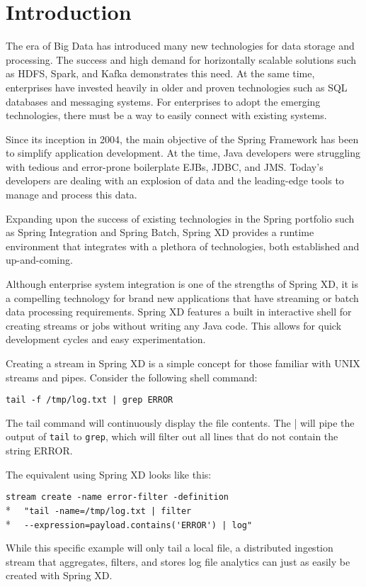 \section{Introduction}

The era of Big Data has introduced many new technologies for data storage
and processing. The success and high demand for horizontally scalable
solutions such as HDFS, Spark, and Kafka demonstrates this need. At the
same time, enterprises have invested heavily in older and proven
technologies such as SQL databases and messaging systems. For enterprises
to adopt the emerging technologies, there must be a way to easily
connect with existing systems.

Since its inception in 2004, the main objective of the Spring Framework
has been to simplify application development. At the time, Java developers
were struggling with tedious and error-prone boilerplate EJBs, JDBC, and
JMS. Today's developers are dealing with an explosion of data and the
leading-edge tools to manage and process this data.

Expanding upon the success of existing technologies in the Spring portfolio
such as Spring Integration and Spring Batch, Spring XD provides a runtime
environment that integrates with a plethora of technologies, both established
and up-and-coming.

Although enterprise system integration is one of the strengths of Spring XD,
it is a compelling technology for brand new applications that have streaming
or batch data processing requirements. Spring XD features a built in
interactive shell for creating streams or jobs without writing any Java code.
This allows for quick development cycles and easy experimentation.

Creating a stream in Spring XD is a simple concept for those familiar with
UNIX streams and pipes. Consider the following shell command:

\verb;tail -f /tmp/log.txt | grep ERROR;

The tail command will continuously display the file contents. The |
will pipe the output of \texttt{tail} to \texttt{grep}, which will filter 
out all lines that do not contain the string ERROR.

The equivalent using Spring XD looks like this:

\verb;stream create -name error-filter -definition;\\*
\verb;  "tail -name=/tmp/log.txt | filter;\\*
\verb;  --expression=payload.contains('ERROR') | log";

While this specific example will only tail a local file, a distributed 
ingestion stream that aggregates, filters, and stores log file analytics
can just as easily be created with Spring XD.
